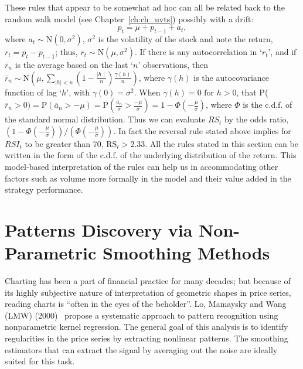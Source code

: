 These rules that appear to be somewhat ad hoc can all be related back to the random walk model (see Chapter~\ref{ch:ch_uvts}) possibly with a drift:
	\begin{equation} \label{eqn:anotherpt}
	p_t = \mu + p_{t-1} + a_t,
	\end{equation}
where $a_t \sim \text{N}(0,\sigma^2)$, $\sigma^2$ is the volatility of the stock and note the return, $r_t= p_t - p_{t-1}$; thus, $r_t \sim \text{N}(\mu,\sigma^2)$. If there is any autocorrelation in `$r_t$', and if $\overline{r}_n$ is the average based on the last `$n$' observations, then $\overline{r}_n \sim \text{N}\left(\mu,\sum_{\mid h \mid < n}\left(1-\frac{\mid h \mid}{n}\right)\frac{\gamma(h)}{n}\right)$, where $\gamma(h)$ is the autocovariance function of lag `$h$', with $\gamma(0)=\sigma^2$. When $\gamma(h)=0 \text{ for } h > 0$, that P($\overline{r}_n > 0)= \text{P}(\overline{a}_n > -\mu)= \text{P}\left( \frac{\overline{a}_n}{\sigma} > \frac{-\mu}{\sigma} \right)= 1 - \Phi\left( -\frac{\mu}{\sigma} \right)$, where $\Phi$ is the c.d.f. of the standard normal distribution. Thus we can evaluate $RS_t$ by the odds ratio, $(1 - \Phi(-\frac{\mu}{\sigma}))/(\Phi(-\frac{\mu}{\sigma}))$. In fact the reversal rule stated above implies for $RSI_t$ to be greater than 70, $\text{RS}_t > 2.33$. All the rules stated in this section can be written in the form of the c.d.f. of the underlying distribution of the return. This model-based interpretation of the rules can help us in accommodating other factors such as volume more formally in the model and their value added in the strategy performance. 



\section{Patterns Discovery via Non-Parametric Smoothing Methods}


Charting has been a part of financial practice for many decades; but because of its highly subjective nature of interpretation of geometric shapes in price series, reading charts is ``often in the eyes of the beholder''. Lo, Mamaysky and Wang (LMW) (2000)~\cite{LoMWang} propose a systematic approach to pattern recognition using nonparametric kernel regression. The general goal of this analysis is to identify regularities in the price series by extracting nonlinear patterns. The smoothing estimators that can extract the signal by averaging out the noise are ideally suited for this task.	


